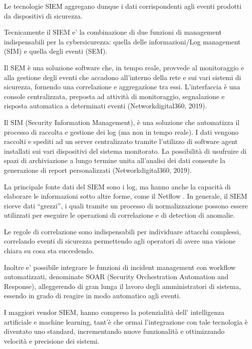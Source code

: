 \newpage

Le tecnologie SIEM aggregano dunque i dati corrispondenti agli eventi prodotti da dispositivi di sicurezza.\par

Tecnicamente il SIEM e’ la combinazione di due funzioni di management indispensabili per la cybersicurezza: quella delle informazioni/Log management (SIM) e quella degli eventi (SEM).\newline

Il SEM è una soluzione software che, in tempo reale, provvede al monitoraggio e alla gestione degli eventi che accadono all'interno della rete e sui vari sistemi di sicurezza, fornendo una correlazione e aggregazione tra essi. L’interfaccia è una console centralizzata, preposta ad attività di monitoraggio, segnalazione e risposta automatica a determinati eventi (Networkdigital360, 2019).\newline

Il SIM (Security Information Management), è una soluzione che automatizza il processo di raccolta e gestione dei log (ma non in tempo reale). I dati vengono raccolti e spediti ad un server centralizzato tramite l’utilizzo di software agent installati sui vari dispositivi del sistema monitorato. La possibilità di usufruire di spazi di archiviazione a lungo termine unita all'analisi dei dati consente la generazione di report personalizzati (Networkdigital360, 2019).\newline

La principale fonte dati del SIEM sono i log, ma hanno anche la capacità di elaborare le informazioni sotto altre forme, come il Netflow .
In generale, il SIEM riceve dati “grezzi”, i quali tramite un processo di normalizzazione possono essere utilizzati per eseguire le operazioni di correlazione e di detection di anomalie.\par
Le regole di correlazione sono indispensabili per individuare attacchi complessi, correlando eventi di sicurezza permettendo agli operatori di avere una visione chiara su cosa sta succedendo.\par
Inoltre e’ possibile integrare le funzioni di incident management con workflow automatizzati, denominate SOAR (Security Orchestration Automation and Response), alleggerendo di gran lunga il lavoro degli amministratori di sistema, essendo in grado di reagire in modo automatico agli eventi.\par
I maggiori vendor SIEM, hanno compreso la potenzialità dell’ intelligenza artificiale e machine learning, tant'è che ormai l’integrazione con tale tecnologia è diventato uno standard, incrementando nuove funzionalità e ottimizzando velocità e precisione dei sistemi.



